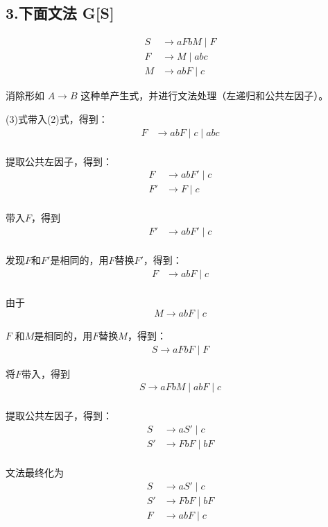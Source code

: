 \documentclass[a4paper, body={18cm,22cm}]{article}
\begin{document}
\subsection*{3.下面文法 G[S]}

\begin{align*}
S &\rightarrow aFbM \mid F \\
F &\rightarrow M \mid abc \\
M &\rightarrow abF \mid c
\end{align*}

消除形如 $A \rightarrow B$ 这种单产生式，并进行文法处理（左递归和公共左因子）。

(3)式带入(2)式，得到：
\begin{align*}
F &\to abF \mid c \mid abc \\
\end{align*}

提取公共左因子，得到：
\begin{align*}
F &\to abF' \mid c \\
F' &\to F \mid c \\
\end{align*}

带入$F$，得到
\begin{align*}
F' &\to abF' \mid c \\
\end{align*}

发现$F$和$F'$是相同的，用$F$替换$F'$，得到：
\begin{align*}
F &\to abF \mid c \\
\end{align*}

由于
$$
M \to abF \mid c
$$

$F$ 和$M$是相同的，用$F$替换$M$，得到：
\begin{align*}
S \to aFbF \mid F
\end{align*}

将$F$带入，得到
\begin{align*}
S \to aFbM \mid abF \mid c \\
\end{align*}

提取公共左因子，得到：
\begin{align*}
S &\to aS' \mid c \\
S' &\to FbF \mid bF \\
\end{align*}

文法最终化为
\begin{align*}
S &\to aS' \mid c \\
S' &\to FbF \mid bF \\
F &\to abF \mid c \\
\end{align*}
\end{document}
